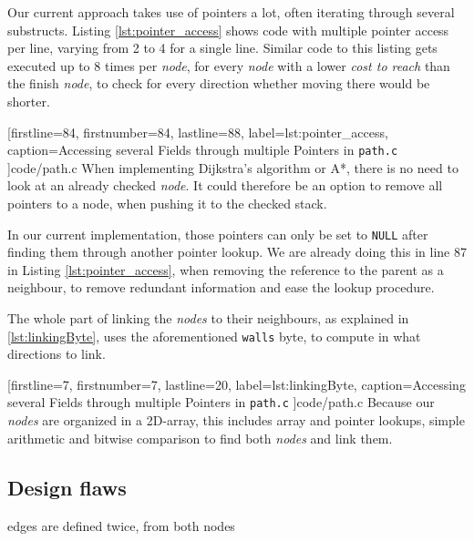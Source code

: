 Our current approach takes use of pointers a lot,
often iterating through several substructs.
Listing \ref{lst:pointer_access} shows code with multiple pointer access per line,
varying from 2 to 4 for a single line.
Similar code to this listing gets executed up to 8 times per \emph{node},
for every \emph{node} with a lower \emph{cost to reach} than the finish \emph{node},
to check for every direction whether moving there would be shorter.


[firstline=84,				%
firstnumber=84,
lastline=88,
label=lst:pointer_access,	%
caption={Accessing several Fields through multiple Pointers in {\tt path.c}}
]{code/path.c}
%
When implementing Dijkstra's algorithm or A*,
there is no need to look at an already checked \emph{node}.
It could therefore be an option to remove all pointers to a node,
when pushing it to the checked stack.

In our current implementation,
those pointers can only be set to {\tt NULL} after finding them through another pointer lookup.
We are already doing this in line 87 in Listing \ref{lst:pointer_access},
when removing the reference to the parent as a neighbour,
to remove redundant information and ease the lookup procedure.

The whole part of linking the \emph{nodes} to their neighbours,
as explained in \ref{lst:linkingByte},
uses the aforementioned {\tt walls} byte,
to compute in what directions to link.


[firstline=7,				%
firstnumber=7,
lastline=20,
label=lst:linkingByte,	%
caption={Accessing several Fields through multiple Pointers in {\tt path.c}}
]{code/path.c}
%
Because our \emph{nodes} are organized in a 2D-array,
this includes array and pointer lookups,
simple arithmetic and
bitwise comparison
to find both \emph{nodes} and link them.

\subsection{Design flaws}
edges are defined twice, from both nodes

